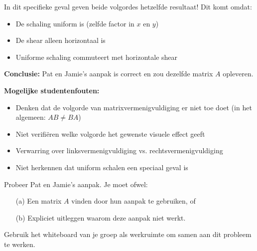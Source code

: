 \documentclass{ximera}
\begin{document}
\begin{freeResponse}
In dit specifieke geval geven beide volgordes hetzelfde resultaat! Dit komt omdat:
\begin{itemize}
\item De schaling uniform is (zelfde factor in $x$ en $y$)
\item De shear alleen horizontaal is
\item Uniforme schaling commuteert met horizontale shear
\end{itemize}

\textbf{Conclusie:} Pat en Jamie's aanpak is correct en zou dezelfde matrix $A$ opleveren.

\textbf{Mogelijke studentenfouten:}
\begin{itemize}
\item Denken dat de volgorde van matrixvermenigvuldiging er niet toe doet (in het algemeen: $AB \neq BA$)
\item Niet verifiëren welke volgorde het gewenste visuele effect geeft
\item Verwarring over linksvermenigvuldiging vs. rechtsvermenigvuldiging
\item Niet herkennen dat uniform schalen een speciaal geval is
\end{itemize}
\end{freeResponse}

\begin{problem}
Probeer Pat en Jamie's aanpak. Je moet ofwel:
\begin{enumerate}
\item[(a)] Een matrix $A$ vinden door hun aanpak te gebruiken, of
\item[(b)] Expliciet uitleggen waarom deze aanpak niet werkt.
\end{enumerate}

Gebruik het whiteboard van je groep als werkruimte om samen aan dit probleem te werken.
\end{problem}
\end{document}
